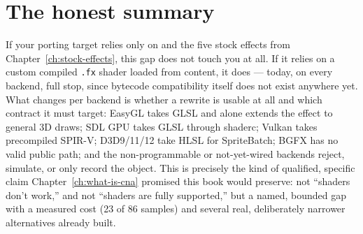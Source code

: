 \section{The honest summary}

If your porting target relies only on  and the five stock effects from
Chapter~\ref{ch:stock-effects}, this gap does not touch you at all. If it relies on a custom
compiled \texttt{.fx} shader loaded from content, it does --- today, on every backend, full
stop, since bytecode compatibility itself does not exist anywhere yet. What changes per
backend is whether a  rewrite is usable at all and which contract it
must target: EasyGL takes GLSL and alone extends the effect to general 3D draws; SDL GPU takes
GLSL through shaderc; Vulkan takes precompiled SPIR-V; D3D9/11/12 take HLSL for SpriteBatch;
BGFX has no valid public path; and the non-programmable or not-yet-wired backends reject,
simulate, or only record the object. This is precisely the kind of qualified, specific claim
Chapter~\ref{ch:what-is-cna} promised this book would preserve: not ``shaders don't work,''
and not ``shaders are fully supported,'' but a named, bounded gap with a measured cost
(23 of 86 samples) and several real, deliberately narrower alternatives already built.
